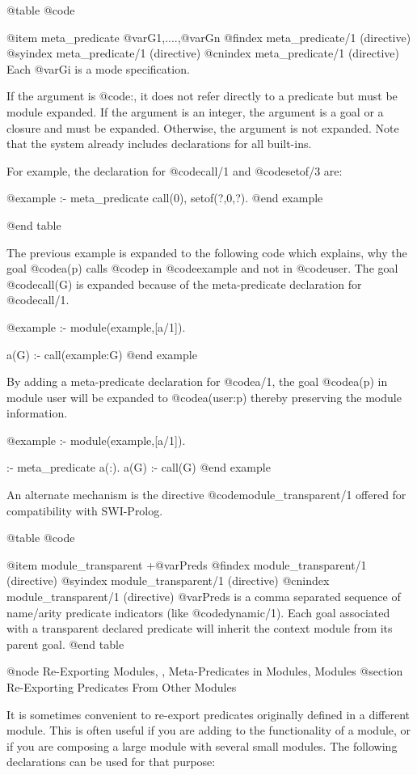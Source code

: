 {{{{@table @code

@item meta_predicate @var{G1},....,@var{Gn}
@findex meta_predicate/1 (directive)
@syindex meta_predicate/1 (directive)
@cnindex meta_predicate/1 (directive)
Each @var{Gi} is a mode specification.

If the argument is @code{:}, it does not refer directly to a predicate
but must be module expanded. If the argument is an integer, the argument
is a goal or a closure and must be expanded. Otherwise, the argument is 
not expanded. Note that the system already includes declarations for all 
built-ins.

For example, the declaration for @code{call/1} and @code{setof/3} are:

@example
:- meta_predicate call(0), setof(?,0,?).
@end example

@end table

The previous example is expanded to the following code which explains,
why the goal @code{a(p)} calls @code{p} in @code{example} and not in
@code{user}.  The goal @code{call(G)} is expanded because of the
meta-predicate declaration for @code{call/1}.

@example
:- module(example,[a/1]).

a(G) :- call(example:G)
@end example

By adding a meta-predicate declaration for @code{a/1}, the goal
@code{a(p)} in module user will be expanded to @code{a(user:p)}
thereby preserving the module information.

@example
:- module(example,[a/1]).

:- meta_predicate a(:).
a(G) :- call(G)
@end example

An alternate mechanism is the directive @code{module_transparent/1}
offered for compatibility with SWI-Prolog.

@table @code

@item module_transparent +@var{Preds}
@findex module_transparent/1 (directive)
@syindex module_transparent/1 (directive)
@cnindex module_transparent/1 (directive)
     @var{Preds} is a comma separated sequence of name/arity predicate
     indicators (like
    @code{dynamic/1}). Each goal associated with a transparent declared
    predicate will inherit the context module from its parent goal.
@end table


@node Re-Exporting Modules, , Meta-Predicates in Modules, Modules
@section Re-Exporting Predicates From Other Modules

It is sometimes convenient to re-export predicates originally defined in
a different module. This is often useful if you are adding to the
functionality of a module, or if you are composing a large module with
several small modules. The following declarations can be used for that purpose:

}}}}

